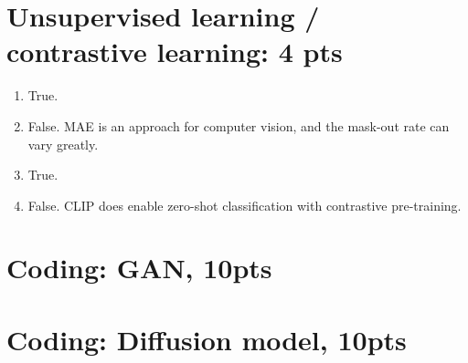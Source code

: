 \documentclass[12pt]{article}
\begin{document}
\section{Unsupervised learning / contrastive learning: 4 pts}
\begin{enumerate}
    \item True.
    \item False. MAE is an approach for computer vision, and the mask-out rate can vary greatly.
    \item True.
    \item False. CLIP does enable zero-shot classification with contrastive pre-training.
\end{enumerate}
\newpage

\section{Coding: GAN, 10pts}

\newpage

\section{Coding: Diffusion model, 10pts}
\end{document}
